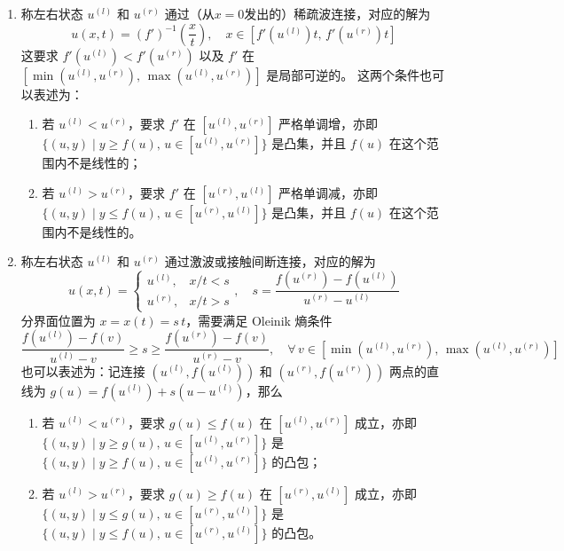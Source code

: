 \begin{enumerate}
    \item 称左右状态 $u^{(l)}$ 和 $u^{(r)}$ 通过（从$x=0$发出的）稀疏波连接，对应的解为
          \[
              u(x,t) = (f')^{-1}\left(\frac{x}{t}\right), \quad  x \in [f'(u^{(l)}) t ,\, f'(u^{(r)}) t ]
          \]
          这要求 $f'(u^{(l)}) < f'(u^{(r)})$ 以及 $f'$ 在 $[\min(u^{(l)},u^{(r)}),\,\max(u^{(l)},u^{(r)})]$ 是局部可逆的。
          这两个条件也可以表述为：

          \begin{enumerate}
              \item 若 $u^{(l)} < u^{(r)}$，要求 $f'$ 在 $[u^{(l)},u^{(r)}]$ 严格单调增，亦即 $\{ (u,y) \mid y \ge f(u),\, u \in [u^{(l)},u^{(r)}]\}$ 是凸集，并且 $f(u)$ 在这个范围内不是线性的；
              \item 若 $u^{(l)} > u^{(r)}$，要求 $f'$ 在 $[u^{(r)},u^{(l)}]$ 严格单调减，亦即 $\{ (u,y) \mid y \le f(u),\, u \in [u^{(r)},u^{(l)}]\}$ 是凸集，并且 $f(u)$ 在这个范围内不是线性的。
          \end{enumerate}

    \item 称左右状态 $u^{(l)}$ 和 $u^{(r)}$ 通过激波或接触间断连接，对应的解为
          \[
              u(x,t) =
              \begin{cases}
                  u^{(l)}, & x/t < s \\
                  u^{(r)}, & x/t > s
              \end{cases}, \quad s = \frac{f(u^{(r)})-f(u^{(l)})}{u^{(r)} - u^{(l)}}
          \]
          分界面位置为 $x = x(t) = s\,t$，需要满足 Oleinik 熵条件
          \[
              \frac{f(u^{(l)})-f(v)}{u^{(l)}-v} \ge s \ge \frac{f(u^{(r)})-f(v)}{u^{(r)}-v},
              \quad \forall\,v \in [\min(u^{(l)}, u^{(r)}),\,\max(u^{(l)}, u^{(r)})]
          \]
          也可以表述为：记连接 $(u^{(l)},f(u^{(l)}))$ 和 $(u^{(r)},f(u^{(r)}))$ 两点的直线为 $g(u) = f(u^{(l)}) + s(u - u^{(l)})$，那么
          \begin{enumerate}
              \item 若 $u^{(l)} < u^{(r)}$，要求 $g(u) \le f(u)$ 在 $[u^{(l)},u^{(r)}]$ 成立，亦即 $\{ (u,y) \mid y \ge g(u),\, u \in [u^{(l)},u^{(r)}]\}$ 是 $\{ (u,y) \mid y \ge f(u),\, u \in [u^{(l)},u^{(r)}]\}$ 的凸包；
              \item 若 $u^{(l)} > u^{(r)}$，要求 $g(u) \ge f(u)$ 在 $[u^{(r)},u^{(l)}]$ 成立，亦即 $\{ (u,y) \mid y \le g(u),\, u \in [u^{(r)},u^{(l)}]\}$ 是 $\{ (u,y) \mid y \le f(u),\, u \in [u^{(r)},u^{(l)}]\}$ 的凸包。
          \end{enumerate}
\end{enumerate}
